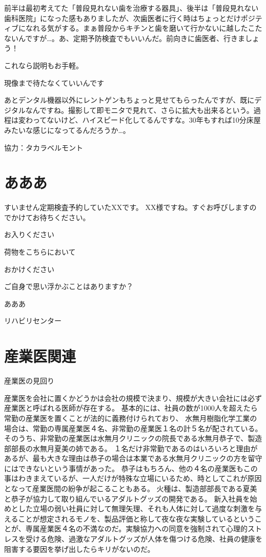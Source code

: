 前半は最初考えてた「普段見れない歯を治療する器具」、後半は「普段見れない歯科医院」になった感もありましたが、次歯医者に行く時はちょっとだけポジティブになれる気がする。まぁ普段からキチンと歯を磨いて行かないに越したこたないんですが…。あ、定期予防検査でもいいんだ。前向きに歯医者、行きましょう！

これなら説明もお手軽。

現像まで待たなくていいんです

あとデンタル機器以外にレントゲンもちょっと見せてもらったんですが、既にデジタルなんですね。撮影して即モニタで見れて、さらに拡大も出来るという。過程は変わってないけど、ハイスピード化してるんですな。30年もすれば10分床屋みたいな感じになってるんだろうか…。

協力：タカラベルモント


\section{あああ}
すいません定期検査予約していたXXです。
XX様ですね。すぐお呼びしますのでかけてお待ちください。

お入りください

荷物をこちらにおいて

おかけください

ご自身で思い浮かぶことはありますか？

あああ

リハビリセンター

\section{産業医関連}




産業医の見回り

産業医を会社に置くかどうかは会社の規模で決まり、規模が大きい会社には必ず産業医と呼ばれる医師が存在する。
基本的には、社員の数が1000人を超えたら常勤の産業医を置くことが法的に義務付けられており、
水無月樹脂化学工業の場合は、常勤の専属産業医４名、非常勤の産業医１名の計５名が配されている。
そのうち、非常勤の産業医は水無月クリニックの院長である水無月恭子で、製造部部長の水無月夏美の姉である。
１名だけ非常勤であるのはいろいろと理由があるが、最も大きな理由は恭子の場合は本業である水無月クリニックの方を留守にはできないという事情があった。
恭子はもちろん、他の４名の産業医もこの事はわきまえているが、一人だけが特殊な立場にいるため、時としてこれが原因となって産業医間の紛争が起こることもある。
火種は、製造部部長である夏美と恭子が協力して取り組んでいるアダルトグッズの開発である。
新入社員を始めとした立場の弱い社員に対して無理矢理、それも人体に対して過度な刺激を与えることが想定されるモノを、製品評価と称して夜な夜な実験しているということが、専属産業医４名の不満なのだ。実験協力への同意を強制されて心理的ストレスを受ける危険、過激なアダルトグッズが人体を傷つける危険、社員の健康を阻害する要因を挙げ出したらキリがないのだ。

